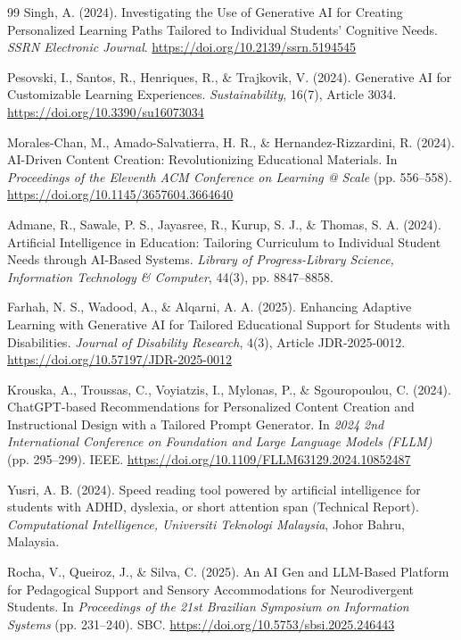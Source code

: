\begin{thebibliography}{99}
Singh, A. (2024). Investigating the Use of Generative AI for Creating Personalized Learning Paths Tailored to Individual Students' Cognitive Needs. \textit{SSRN Electronic Journal}. \url{https://doi.org/10.2139/ssrn.5194545}

Pesovski, I., Santos, R., Henriques, R., \& Trajkovik, V. (2024). Generative AI for Customizable Learning Experiences. \textit{Sustainability}, 16(7), Article 3034. \url{https://doi.org/10.3390/su16073034}

Morales-Chan, M., Amado-Salvatierra, H. R., \& Hernandez-Rizzardini, R. (2024). AI-Driven Content Creation: Revolutionizing Educational Materials. In \textit{Proceedings of the Eleventh ACM Conference on Learning @ Scale} (pp. 556--558). \url{https://doi.org/10.1145/3657604.3664640}

Admane, R., Sawale, P. S., Jayasree, R., Kurup, S. J., \& Thomas, S. A. (2024). Artificial Intelligence in Education: Tailoring Curriculum to Individual Student Needs through AI-Based Systems. \textit{Library of Progress-Library Science, Information Technology \& Computer}, 44(3), pp. 8847--8858.

Farhah, N. S., Wadood, A., \& Alqarni, A. A. (2025). Enhancing Adaptive Learning with Generative AI for Tailored Educational Support for Students with Disabilities. \textit{Journal of Disability Research}, 4(3), Article JDR-2025-0012. \url{https://doi.org/10.57197/JDR-2025-0012}

Krouska, A., Troussas, C., Voyiatzis, I., Mylonas, P., \& Sgouropoulou, C. (2024). ChatGPT-based Recommendations for Personalized Content Creation and Instructional Design with a Tailored Prompt Generator. In \textit{2024 2nd International Conference on Foundation and Large Language Models (FLLM)} (pp. 295--299). IEEE. \url{https://doi.org/10.1109/FLLM63129.2024.10852487}

Yusri, A. B. (2024). Speed reading tool powered by artificial intelligence for students with ADHD, dyslexia, or short attention span (Technical Report). \textit{Computational Intelligence, Universiti Teknologi Malaysia}, Johor Bahru, Malaysia.

Rocha, V., Queiroz, J., \& Silva, C. (2025). An AI Gen and LLM-Based Platform for Pedagogical Support and Sensory Accommodations for Neurodivergent Students. In \textit{Proceedings of the 21st Brazilian Symposium on Information Systems} (pp. 231--240). SBC. \url{https://doi.org/10.5753/sbsi.2025.246443}


\end{thebibliography}
